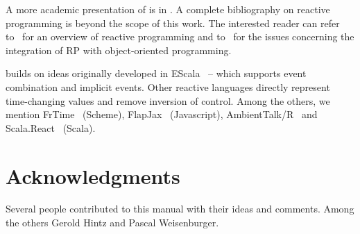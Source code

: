 \documentclass[10pt,a4paper]{article}
\newcommand{\REScala}{{\small \sc{REScala}}\xspace}
\begin{document}
A more academic presentation of \REScala is in \cite{rescala}. A
complete bibliography on reactive programming is beyond the scope of
this work. The interested reader can refer
to~\cite{rective-progr-survey} for an overview of reactive programming
and to~\cite{Salvaneschi:2013:RBO:2451436.2451442} for the issues
concerning the integration of RP with object-oriented programming.


\REScala builds on ideas originally developed in
EScala~\cite{Gasiunas:2011:EME:1960275.1960303} -- which supports
event combination and implicit events. Other reactive languages
directly represent time-changing values and remove inversion of
control. Among the others, we mention
FrTime~\cite{DBLP:conf/esop/CooperK06} (Scheme),
FlapJax~\cite{Meyerovich:2009:FPL:1640089.1640091} (Javascript),
AmbientTalk/R~\cite{ambienttalkR} and
Scala.React~\cite{EPFL-REPORT-148043} (Scala).




\newpage



\section{Acknowledgments}\label{sec:ack}

Several people contributed to this manual with their ideas and
comments. Among the others Gerold Hintz and Pascal Weisenburger.




\newpage





\end{document}
